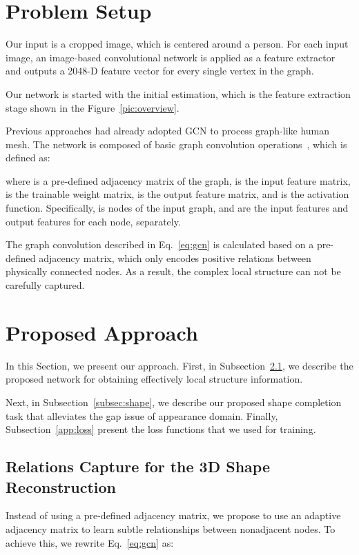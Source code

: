 \documentclass[sigplan]{acmart}
\begin{document}
\section{Problem Setup}
\label{sec:problemSetup}
Our input is a cropped image, which is centered around a person. For each input image, an image-based convolutional network is applied as a feature extractor and outputs a 2048-D feature vector for every single vertex in the graph.

Our network is started with the initial estimation, which is the feature extraction stage shown in the Figure~\ref{pic:overview}.

Previous approaches had already adopted GCN to process graph-like human mesh. The network is composed of basic graph convolution operations~\cite{kipf2017semi-supervised}, which is defined as:

where  is a pre-defined adjacency matrix of the graph,  is the input feature matrix,  is the trainable weight matrix,  is the output feature matrix, and  is the activation function. Specifically,  is nodes of the input graph,  and  are the input features and output features for each node, separately. 

The graph convolution described in Eq.~\eqref{eq:gcn} is calculated based on a pre-defined adjacency matrix, which only encodes positive relations between physically connected nodes. As a result, the complex local structure can not be carefully captured.

\section{Proposed Approach}
In this Section, we present our approach. First, in Subsection~\ref{subsec:local}, we describe the proposed network for obtaining effectively local structure information.

Next, in Subsection~\ref{subsec:shape}, we describe our proposed shape completion task that alleviates the gap issue of appearance domain. Finally, Subsection~\ref{app:loss} present the loss functions that we used for training.

\subsection{Relations Capture for the 3D Shape Reconstruction}
\label{subsec:local}
Instead of using a pre-defined adjacency matrix, we propose to use an adaptive adjacency matrix to learn subtle relationships between nonadjacent nodes.  
To achieve this, we rewrite Eq.~\eqref{eq:gcn} as:
\end{document}
